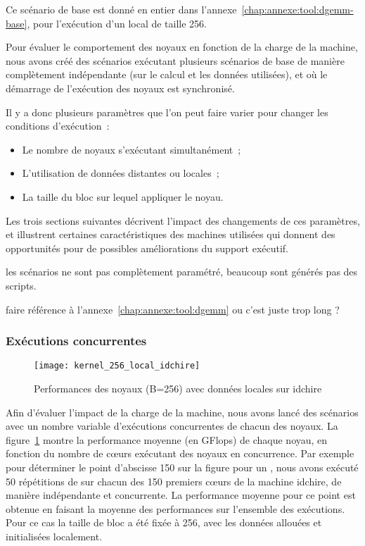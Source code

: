 Ce scénario de base est donné en entier dans l'annexe~\ref{chap:annexe:tool:dgemm-base}, pour l'exécution d'un \gemm local de taille 256.

Pour évaluer le comportement des noyaux en fonction de la charge de la machine, nous avons créé des scénarios exécutant plusieurs scénarios de base de manière complètement indépendante (sur le calcul et les données utilisées), et où le démarrage de l'exécution des noyaux est synchronisé.

Il y a donc plusieurs paramètres que l'on peut faire varier pour changer les conditions d'exécution~:
\begin{itemize}
  \item Le nombre de noyaux s'exécutant simultanément~;
  \item L'utilisation de données distantes ou locales~;
  \item La taille du bloc sur lequel appliquer le noyau.
\end{itemize}

Les trois sections suivantes décrivent l'impact des changements de ces paramètres, et illustrent certaines caractéristiques des machines utilisées qui donnent des opportunités pour de possibles améliorations du support exécutif.

\begin{todo}
  les scénarios ne sont pas complètement paramétré, beaucoup sont générés pas des scripts.

faire référence à l'annexe~\ref{chap:annexe:tool:dgemm} ou c'est juste trop long ?
\end{todo}

\subsubsection{Exécutions concurrentes}

\begin{figure}[ht]
  \centering
  \texttt{[image: kernel\_256\_local\_idchire]}
  \caption{Performances des noyaux (B=256) avec données locales sur idchire}\label{fig:contribs:apps:cholesky:perf-256-local}
\end{figure}

Afin d'évaluer l'impact de la charge de la machine, nous avons lancé des scénarios avec un nombre variable d'exécutions concurrentes de chacun des noyaux. La figure~\ref{fig:contribs:apps:cholesky:perf-256-local} montre la performance moyenne (en GFlops) de chaque noyau, en fonction du nombre de cœurs exécutant des noyaux en concurrence.
Par exemple pour déterminer le point d'abscisse 150 sur la figure pour un \gemm, nous avons exécuté 50 répétitions de \gemm sur chacun des 150 premiers cœurs de la machine idchire, de manière indépendante et concurrente.
La performance moyenne pour ce point est obtenue en faisant la moyenne des performances sur l'ensemble des exécutions.
Pour ce cas la taille de bloc a été fixée à 256, avec les données allouées et initialisées localement.

